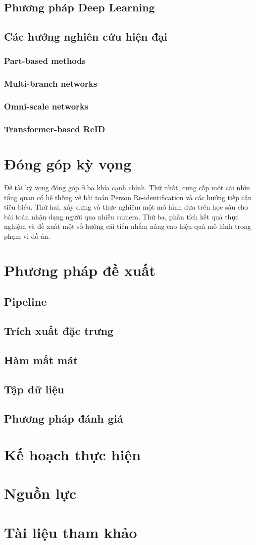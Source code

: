 \subsection{Phương pháp Deep Learning}
\subsection{Các hướng nghiên cứu hiện đại}
\subsubsection*{Part-based methods}
\subsubsection*{Multi-branch networks}
\subsubsection*{Omni-scale networks}
\subsubsection*{Transformer-based ReID}

\section{Đóng góp kỳ vọng}
Đề tài kỳ vọng đóng góp ở ba khía cạnh chính. Thứ nhất, cung cấp một cái nhìn tổng quan có hệ thống về bài toán Person Re-identification và các hướng tiếp cận tiêu biểu. Thứ hai, xây dựng và thực nghiệm một mô hình dựa trên học sâu cho bài toán nhận dạng người qua nhiều camera. Thứ ba, phân tích kết quả thực nghiệm và đề xuất một số hướng cải tiến nhằm nâng cao hiệu quả mô hình trong phạm vi đồ án.

\section{Phương pháp đề xuất}
\subsection{Pipeline}
\subsection{Trích xuất đặc trưng}
\subsection{Hàm mất mát}
\subsection{Tập dữ liệu}
\subsection{Phương pháp đánh giá}

\section{Kế hoạch thực hiện}

\section{Nguồn lực}

\section{Tài liệu tham khảo}
